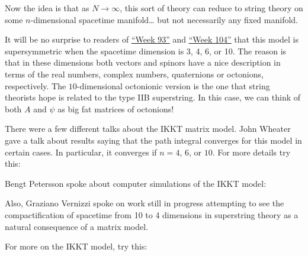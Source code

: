 \documentclass{article}
\def\tightlist{}
\renewcommand{\texttt}[1]{%
  \begingroup
  \ttfamily
  \begingroup\lccode`~=`/\lowercase{\endgroup\def~}{/\discretionary{}{}{}}%
  \begingroup\lccode`~=`[\lowercase{\endgroup\def~}{[\discretionary{}{}{}}%
  \begingroup\lccode`~=`.\lowercase{\endgroup\def~}{.\discretionary{}{}{}}%
  \catcode`/=\active\catcode`[=\active\catcode`.=\active
  \scantokens{#1\noexpand}%
  \endgroup
}
\begin{document}
Now the idea is that as \(N \to \infty\), this sort of theory can reduce
to string theory on some \(n\)-dimensional spacetime manifold\ldots{}
but not necessarily any fixed manifold.

It will be no surprise to readers of \protect\hyperlink{week93}{``Week
93''} and \protect\hyperlink{week104}{``Week 104''} that this model is
supersymmetric when the spacetime dimension is 3, 4, 6, or 10. The
reason is that in these dimensions both vectors and spinors have a nice
description in terms of the real numbers, complex numbers, quaternions
or octonions, respectively. The \(10\)-dimensional octonionic version is
the one that string theorists hope is related to the type IIB
superstring. In this case, we can think of both \(A\) and \(\psi\) as
big fat matrices of octonions!

There were a few different talks about the IKKT matrix model. John
Wheater gave a talk about results saying that the path integral
converges for this model in certain cases. In particular, it converges
if \(n = 4\), \(6\), or \(10\). For more details try this:


Bengt Petersson spoke about computer simulations of the IKKT model:


Also, Graziano Vernizzi spoke on work still in progress attempting to
see the compactification of spacetime from 10 to 4 dimensions in
superstring theory as a natural consequence of a matrix model.

For more on the IKKT model, try this:

\end{document}
